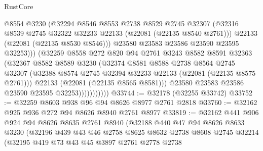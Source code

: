 \begin{lexlean}{RustCore}
\begin{coremodule}
                            @8554
                            @3230
                            (@32294
                              @8546
                              @8553
                              @2738
                              @8529
                              @2745
                              @32307
                              (@32316
                                @8539
                                @2745
                                @32322
                                @32233
                                @22133
                                (@22081 (@22135 @8540 @2761)))
                              @22133
                              (@22081 (@22135 @8530 @8546)))
                            @23580
                            @23583
                            @23586
                            @23590
                            @23595
                            @32253)))
                      (@32259
                        @8558
                        @272
                        @820
                        @94
                        @2761
                        @3243
                        @8582
                        @8591
                        @32363
                        (@32367
                          @8582
                          @8589
                          @3230
                          (@32374
                            @8581
                            @8588
                            @2738
                            @8564
                            @2745
                            @32307
                            (@32388 @8574 @2745 @32394 @32233 @22133 (@22081 (@22135 @8575 @2761)))
                            @22133
                            (@22081 (@22135 @8565 @8581)))
                          @23580
                          @23583
                          @23586
                          @23590
                          @23595
                          @32253)))))))))))
@33744 := @32178 (@32255 @33742)
@33752 := @32259 @8603 @938 @96 @94 @8626 @8977 @2761 @2818
@33760 := @32162 @925 @936 @272 @94 @8626 @8940 @2761 @8977
@33819 := @32162
    @441
    @906
    @924
    @94
    @8626
    @8635
    @2761
    @8940
    (@32188
      @440
      @47
      @94
      @8626
      @8633
      @3230
      (@32196
        @439
        @43
        @46
        @2758
        @8625
        @8632
        @2738
        @8608
        @2745
        @32214
        (@32195
          @419
          @73
          @43
          @45
          @3897
          @2761
          @2778
          @2738

\end{coremodule}
\end{lexlean}

